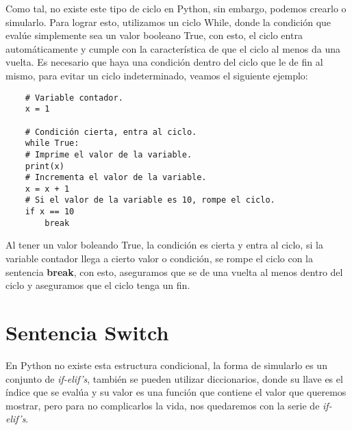 Como tal, no existe este tipo de ciclo en Python, sin embargo, podemos crearlo o simularlo. Para lograr esto, utilizamos un ciclo While, donde la condición que evalúe simplemente sea un valor booleano True, con esto, el ciclo entra automáticamente y cumple con la característica de que el ciclo al menos da una vuelta. Es necesario que haya una condición dentro del ciclo que le de fin al mismo, para evitar un ciclo indeterminado, veamos el siguiente ejemplo:
\begin{lstlisting}
    # Variable contador.
    x = 1

    # Condición cierta, entra al ciclo.
    while True:
	# Imprime el valor de la variable.
	print(x)
	# Incrementa el valor de la variable.
	x = x + 1
	# Si el valor de la variable es 10, rompe el ciclo.
	if x == 10
		break
\end{lstlisting}

Al tener un valor boleando True, la condición es cierta y entra al ciclo, si la variable contador llega a cierto valor o condición, se rompe el ciclo con la sentencia \textbf{break}, con esto, aseguramos que se de una vuelta al menos dentro del ciclo y aseguramos que el ciclo tenga un fin.



\section{Sentencia Switch}

En Python no existe esta estructura condicional, la forma de simularlo es un conjunto de \textit{if-elif's}, también se pueden utilizar diccionarios, donde su llave es el índice que se evalúa y su valor es una función que contiene el valor que queremos mostrar, pero para no complicarlos la vida, nos quedaremos con la serie de \textit{if-elif's}.